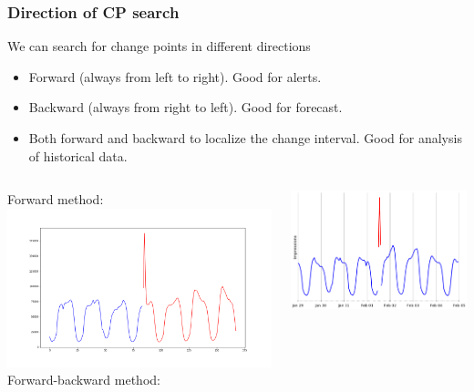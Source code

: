 \documentclass[intlimits, 9pt, unicode]{beamer}
\begin{document}
\begin{frame}
    \frametitle{Direction of CP search}
We can search for change points in different directions
\begin{itemize}
	\item Forward (always from left to right). Good for alerts.
\medskip
	\item Backward (always from right to left). Good for forecast.
\medskip
	\item Both forward and backward to localize the change interval. Good for analysis of historical data.
\end{itemize}

\smallskip
  \begin{columns}[T,onlytextwidth]
      Forward method:
	\includegraphics[scale=0.15]{images/022_point_cp_detected}
      Forward-backward method:

      \vspace*{0.3cm}
	\includegraphics[scale=0.15]{images/methods_comparison_4}
     \end{columns}


\end{frame}
\end{document}
